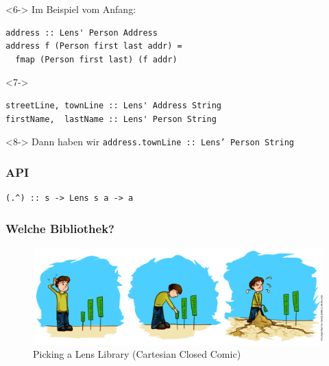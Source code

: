 \documentclass{beamer}
\newcommand{\hask}[1]{\texttt{#1}} %
\begin{document}
\begin{frame}[fragile]
  \begin{visibleenv}<6->
    Im Beispiel vom Anfang:
\begin{verbatim}
address :: Lens' Person Address
address f (Person first last addr) =
  fmap (Person first last) (f addr)
\end{verbatim}
  \end{visibleenv}
  \begin{visibleenv}<7->
\begin{verbatim}
streetLine, townLine :: Lens' Address String
firstName,  lastName :: Lens' Person String
\end{verbatim}
  \end{visibleenv}
  \begin{visibleenv}<8->
    Dann haben wir \enspace
    \hask{address.townLine :: Lens' Person String}
  \end{visibleenv}
\end{frame}

\begin{frame}[fragile]
  \frametitle{API}
\begin{verbatim}
(.^) :: s -> Lens s a -> a
\end{verbatim}
\end{frame}

\begin{frame}
  \frametitle{Welche Bibliothek?}
  \begin{figure}
    \includegraphics[width=0.9\linewidth]{ccc-picking-lens-library.png}
    \caption{Picking a Lens Library (Cartesian Closed Comic)}
  \end{figure}
\end{frame}
\end{document}
